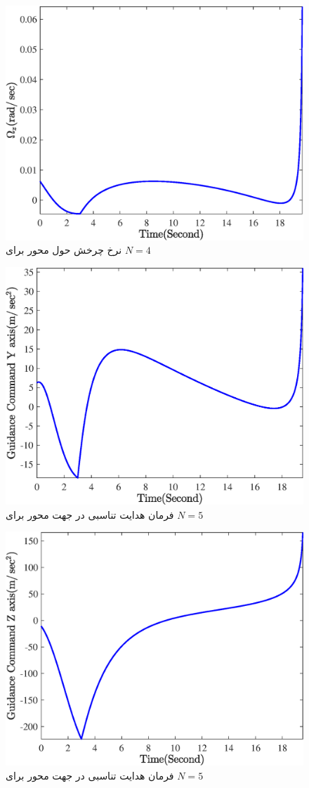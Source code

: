 \begin{figure}[H]
	\centering
	\includegraphics[width=.75\linewidth]{../Figure/Q1/b/Omega_z_4}
	\caption{ نرخ چرخش حول محور
		برای 
		$N=4$}
\end{figure}
\begin{figure}[H]
	\centering
	\includegraphics[width=.75\linewidth]{../Figure/Q1/b/GC_y_5}
	\caption{فرمان هدایت تناسبی در جهت محور
		برای 
		$N=5$}
\end{figure}

\begin{figure}[H]
	\centering
	\includegraphics[width=.75\linewidth]{../Figure/Q1/b/GC_z_5}
	\caption{فرمان هدایت تناسبی در جهت محور
		برای 
		$N=5$}
\end{figure}

